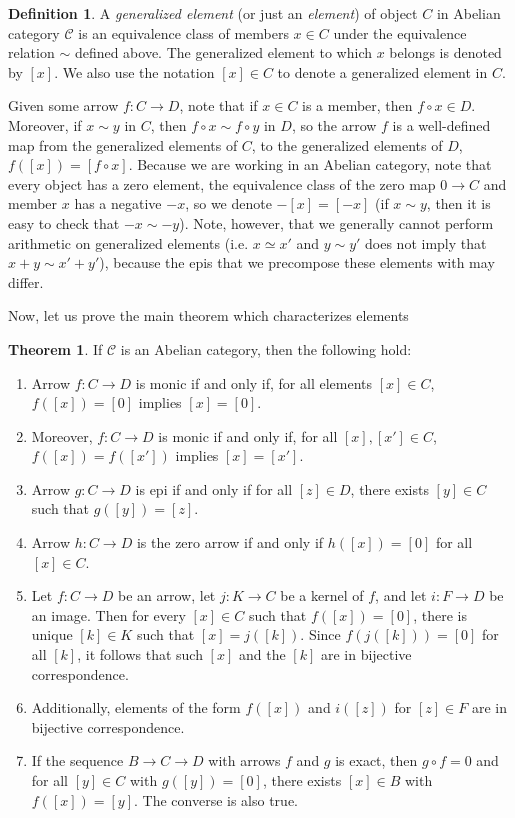 \documentclass[aps,pra,showpacs,notitlepage,onecolumn,superscriptaddress,nofootinbib]{revtex4-1}
\theoremstyle{definition}
\newtheorem{definition}{Definition}[section]
\newtheorem{theorem}{Theorem}[section]
\begin{document}
\begin{definition}
  A \emph{generalized element} (or just an \emph{element}) of object $C$ in Abelian category $\mathcal{C}$ is an equivalence class of members $x \in C$ under the equivalence relation $\sim$ defined above. The generalized element
  to which $x$ belongs is denoted by $[x]$. We also use the notation $[x] \in C$ to denote a generalized element in $C$.
\end{definition}

Given some arrow $f : C \rightarrow D$, note that if $x \in C$ is a member, then $f \circ x \in D$. Moreover, if $x \sim y$ in $C$, then $f \circ x \sim f \circ y$ in $D$, so the arrow $f$ is a well-defined map
from the generalized elements of $C$, to the generalized elements of $D$, $f([x]) = [f \circ x]$. Because we are working in an Abelian category, note that every object has a zero element, the equivalence class
of the zero map $0 \to C$ and member $x$ has a negative $-x$, so we denote $-[x] = [-x]$ (if $x \sim y$, then it is easy to check that $-x \sim -y$). Note, however, that we generally cannot perform
arithmetic on generalized elements (i.e. $x \simeq x'$ and $y \sim y'$ does not imply that $x + y \sim x' + y'$), because the epis that we precompose these elements with may differ.

Now, let us prove the main theorem which characterizes elements

\begin{theorem}
  If $\mathcal{C}$ is an Abelian category, then the following hold:
  \begin{enumerate}
    \item Arrow $f : C \rightarrow D$ is monic if and only if, for all elements $[x] \in C$, $f([x]) = [0]$ implies $[x] = [0]$.
    \item Moreover, $f : C \rightarrow D$ is monic if and only if, for all $[x], [x'] \in C$, $f([x]) = f([x'])$ implies $[x] = [x']$.
    \item Arrow $g : C \rightarrow D$ is epi if and only if for all $[z] \in D$, there exists $[y] \in C$ such that $g([y]) = [z]$.
    \item Arrow $h : C \rightarrow D$ is the zero arrow if and only if $h([x]) = [0]$ for all $[x] \in C$.
      \item Let $f : C \rightarrow D$ be an arrow, let $j : K \rightarrow C$ be a kernel of $f$, and let $i : F \rightarrow D$ be an image. Then for every $[x] \in C$
        such that $f([x]) = [0]$, there is unique $[k] \in K$ such that $[x] = j([k])$. Since $f(j([k])) = [0]$ for all $[k]$, it follows that such $[x]$ and the $[k]$ are in bijective
        correspondence.
     \item Additionally, elements of the form $f([x])$ and $i([z])$ for $[z] \in F$ are in bijective correspondence.
    \item If the sequence $B \rightarrow C \rightarrow D$ with arrows $f$ and $g$ is exact, then $g \circ f = 0$ and for all $[y] \in C$
      with $g([y]) = [0]$, there exists $[x] \in B$ with $f([x]) = [y]$. The converse is also true.
    \end{enumerate}
  \end{theorem}
\end{document}
